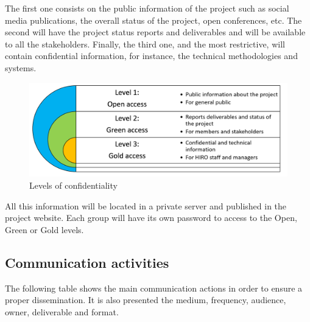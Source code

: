 The first one consists on the public information of the project such as social media publications, the overall status of the project, open conferences, etc. The second will have the project status reports and deliverables and will be available to all the stakeholders. Finally, the third one, and the most restrictive, will contain confidential information, for instance, the technical methodologies and systems.

\begin{figure}[H]
	\centering
	\includegraphics[width=\textwidth]{images/knowledgement.png}
	\caption{Levels of confidentiality} 
	\label{knowledge}
\end{figure}

All this information will be located in a private server and published in the project website. Each group will have its own password to access to the Open, Green or Gold levels.

\subsection{Communication activities}

The following table shows the main communication actions in order to ensure a proper dissemination. It is also presented the medium, frequency, audience, owner, deliverable and format.

